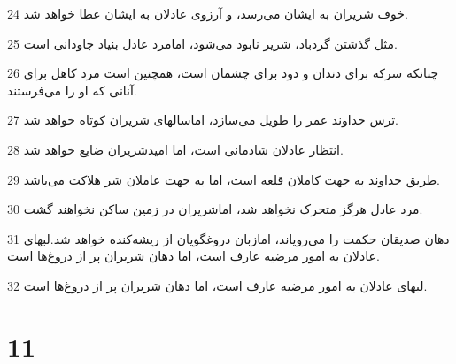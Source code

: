\par 24 خوف شریران به ایشان می‌رسد، و آرزوی عادلان به ایشان عطا خواهد شد.
\par 25 مثل گذشتن گردباد، شریر نابود می‌شود، امامرد عادل بنیاد جاودانی است.
\par 26 چنانکه سرکه برای دندان و دود برای چشمان است، همچنین است مرد کاهل برای آنانی که او را می‌فرستند.
\par 27 ترس خداوند عمر را طویل می‌سازد، اماسالهای شریران کوتاه خواهد شد.
\par 28 انتظار عادلان شادمانی است، اما امیدشریران ضایع خواهد شد.
\par 29 طریق خداوند به جهت کاملان قلعه است، اما به جهت عاملان شر هلاکت می‌باشد.
\par 30 مرد عادل هرگز متحرک نخواهد شد، اماشریران در زمین ساکن نخواهند گشت.
\par 31 دهان صدیقان حکمت را می‌رویاند، امازبان دروغگویان از ریشه‌کنده خواهد شد.لبهای عادلان به امور مرضیه عارف است، اما دهان شریران پر از دروغ‌ها است.
\par 32 لبهای عادلان به امور مرضیه عارف است، اما دهان شریران پر از دروغ‌ها است.
 
\chapter{11}

